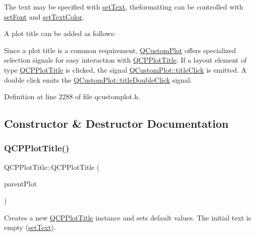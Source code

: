 The text may be specified with \hyperlink{class_q_c_p_plot_title_aae5a93e88050dfb2cbf6adc087516821}{set\+Text}, theformatting can be controlled with \hyperlink{class_q_c_p_plot_title_a199fc7170802ea65006c371875349e37}{set\+Font} and \hyperlink{class_q_c_p_plot_title_a71273e3a0ca6b4c151591b37b9e5ce33}{set\+Text\+Color}.

A plot title can be added as follows\+: 
\begin{DoxyCodeInclude}
\end{DoxyCodeInclude}
 Since a plot title is a common requirement, \hyperlink{class_q_custom_plot}{Q\+Custom\+Plot} offers specialized selection signals for easy interaction with \hyperlink{class_q_c_p_plot_title}{Q\+C\+P\+Plot\+Title}. If a layout element of type \hyperlink{class_q_c_p_plot_title}{Q\+C\+P\+Plot\+Title} is clicked, the signal \hyperlink{class_q_custom_plot_a2137a819e518fee7edd1c0bf5984d8d6}{Q\+Custom\+Plot\+::title\+Click} is emitted. A double click emits the \hyperlink{class_q_custom_plot_ad51d65f6abf5edfaeef6e0519a4c1a2f}{Q\+Custom\+Plot\+::title\+Double\+Click} signal. 

Definition at line 2288 of file qcustomplot.\+h.



\subsection{Constructor \& Destructor Documentation}
\mbox{\label{class_q_c_p_plot_title_aaae17bee2de6d6a1e695f76fb1abed03}} 
\subsubsection{\texorpdfstring{Q\+C\+P\+Plot\+Title()}{QCPPlotTitle()}\hspace{0.1cm}{\footnotesize\ttfamily [1/2]}}
{\footnotesize\ttfamily Q\+C\+P\+Plot\+Title\+::\+Q\+C\+P\+Plot\+Title (\begin{DoxyParamCaption}\item[{\hyperlink{class_q_custom_plot}{Q\+Custom\+Plot} $\ast$}]{parent\+Plot }\end{DoxyParamCaption})\hspace{0.3cm}{\ttfamily [explicit]}}

Creates a new \hyperlink{class_q_c_p_plot_title}{Q\+C\+P\+Plot\+Title} instance and sets default values. The initial text is empty (\hyperlink{class_q_c_p_plot_title_aae5a93e88050dfb2cbf6adc087516821}{set\+Text}).

